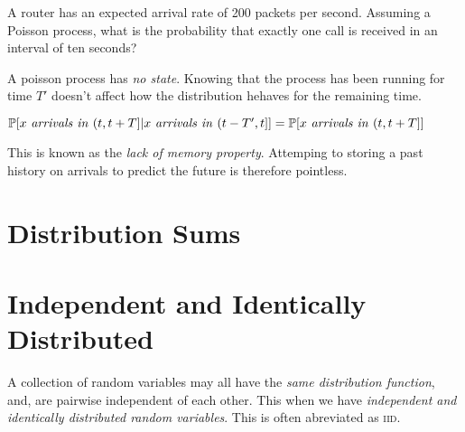 \frmrule

\begin{example}
A router has an expected arrival rate of 200 packets per second.
Assuming a Poisson process, what is the probability that exactly
one call is received in an interval of ten seconds?
\end{example}




\frmrule

A poisson process has \textit{no state}. 
Knowing that the process has been running for time $T'$ doesn’t
affect how the distribution hehaves for the remaining time.

$\mathbb{P}[x \text{ \textit{arrivals in} } (t,t+T] | 
x \text{ \textit{arrivals in} } (t-T',t]]
= \mathbb{P}[x \text{ \textit{arrivals in} } (t,t+T]]$

This is known as the \textit{lack of memory property}. 
Attemping to storing a past history on arrivals to predict 
the future is therefore pointless. 


\section{Distribution Sums}




\section{Independent and Identically Distributed}


A collection of random variables may all have the 
\textit{same distribution function}, and, are pairwise independent 
of each other. This when we have \textit{independent and identically 
distributed random variables}. This is often abreviated as \textsc{iid}.

